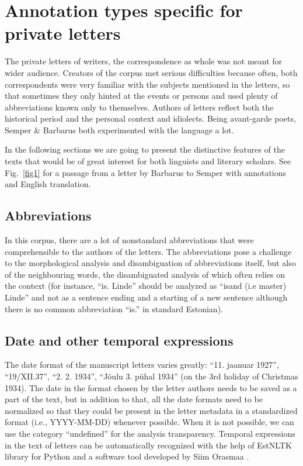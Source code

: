 \documentclass[runningheads]{llncs}
\begin{document}
\section{Annotation types specific for private letters}

The private letters of writers, the correspondence as whole was not meant for wider audience. Creators of the corpus met serious difficulties because often, both correspondents were very familiar with the subjects mentioned in the letters, so that sometimes they only hinted at the events or persons and used plenty of abbreviations known only to themselves. Authors of letters reflect both the historical period and the personal context and idiolects. Being avant-garde poets, Semper \& Barbarus both experimented with the language a lot. 

In the following sections we are going to present the distinctive features of the texts that would be of great interest for both linguists and literary scholars.  See Fig.~\ref{fig1} for a passage from a letter by Barbarus to Semper with annotations and English translation.

\subsection{Abbreviations}

In this corpus, there are a lot of nonstandard abbreviations that were comprehensible to the authors of the letters. The abbreviations pose a challenge to the morphological analysis and disambiguation of abbreviations itself, but also of the neighbouring words, the disambiguated analysis of which often relies on the context (for instance, ``is. Linde'' should be analyzed as ``isand (i.e master) Linde'' and not as a sentence ending and a starting of a new sentence although there is no common abbreviation ``is.'' in standard Estonian). 

\subsection{Date and other temporal expressions}

The date format of the manuscript letters varies greatly: ``11. jaanuar 1927'', ``19/XII.37'', ``2. 2. 1934'', ``J\~oulu 3. p\"uhal 1934'' (on the 3rd holiday of Christmas 1934). The date in the format chosen by the letter authors needs to be saved as a part of the text, but in addition to that, all the date formats need to be normalized so that they could be present in the letter metadata in a standardized format (i.e., YYYY-MM-DD) whenever possible. When it is not possible, we can use the category ``undefined'' for the analysis transparency. Temporal expressions in the text of letters can be automatically recognized with the help of EstNLTK library for Python \cite{ORASMAA16.332} and a software tool developed by Siim Orasmaa \cite{ORASMAA14.530}. 
\end{document}
